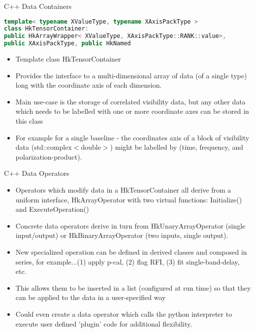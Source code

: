\documentclass[xcolor=svgnames]{beamer}
\begin{document}
\begin{frame}[fragile]{C++ Data Containers}

\begin{lstlisting}[language=C++,basicstyle=\ttfamily\tiny,keywordstyle=\color{red}]
template< typename XValueType, typename XAxisPackType >
class HkTensorContainer: 
public HkArrayWrapper< XValueType, XAxisPackType::RANK::value>, 
public XAxisPackType, public HkNamed
\end{lstlisting}

\begin{itemize}
\item Template class HkTensorContainer
\item Provides the interface to a multi-dimensional array of data (of a single type) long with the coordinate axis of each dimension.
\item Main use-case is the storage of correlated visibility data, but any other data which needs to be labelled with one or more coordinate axes can be stored in this class
\item For example for a single baseline - the coordinates axis of a block of visibility data (std::complex$<$double$>$) might be labelled by (time, frequency, and polarization-product).
\end{itemize}

\end{frame}


\begin{frame}{C++ Data Operators}

\begin{itemize}
\item Operators which modify data in a HkTensorContainer all derive from a uniform interface, HkArrayOperator with two virtual functions: Initialize() and ExecuteOperation()
\item Concrete data operators derive in turn from HkUnaryArrayOperator (single input/output) or HkBinaryArrayOperator (two inputs, single output).
\item New specialized operation can be defined in derived classes and composed in series, for example...(1) apply p-cal, (2) flag RFI, (3) fit single-band-delay, etc.
\item This allows them to be inserted in a list (configured at run time) so that they can be applied to the data in a user-specified way
\item Could even create a data operator which calls the python interpreter to execute user defined 'plugin' code for additional flexibility.
\end{itemize}

\end{frame}
\end{document}
